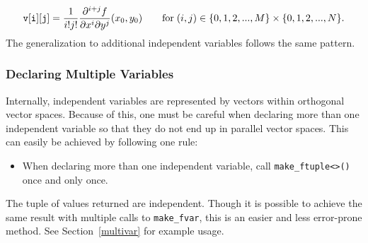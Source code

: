 \documentclass{article}
\begin{document}
\[
{\tt v[i][j]} = \frac{1}{i!j!}\frac{\partial^{i+j}f}{\partial x^i\partial y^j}(x_0,y_0)
    \qquad \text{for}\; (i,j)\in\{0,1,2,...,M\}\times\{0,1,2,...,N\}.
\]
The generalization to additional independent variables follows the same pattern.

\subsubsection{Declaring Multiple Variables}

Internally, independent variables are represented by vectors within orthogonal vector spaces. Because of this,
one must be careful when declaring more than one independent variable so that they do not end up in
parallel vector spaces. This can easily be achieved by following one rule:
\begin{itemize}
\item When declaring more than one independent variable, call {\tt make\_ftuple<>()} once and only once.
\end{itemize}
The tuple of values returned are independent. Though it is possible to achieve the same result with multiple calls
to {\tt make\_fvar}, this is an easier and less error-prone method. See Section~\ref{multivar} for example usage.
\end{document}
